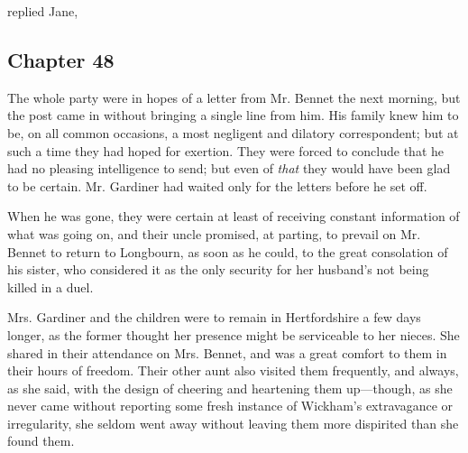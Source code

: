 replied Jane, 

\subsection[chapter-48]{\useURL[url48][][][]\from[url48] Chapter 48}

The whole party were in hopes of a letter from Mr. Bennet the next morning, but the post came in without bringing a single line from him. His family knew him to be, on all common occasions, a most negligent and dilatory correspondent; but at such a time they had hoped for exertion. They were forced to conclude that he had no pleasing intelligence to send; but even of {\em that} they would have been glad to be certain. Mr. Gardiner had waited only for the letters before he set off.

When he was gone, they were certain at least of receiving constant information of what was going on, and their uncle promised, at parting, to prevail on Mr. Bennet to return to Longbourn, as soon as he could, to the great consolation of his sister, who considered it as the only security for her husband's not being killed in a duel.

Mrs. Gardiner and the children were to remain in Hertfordshire a few days longer, as the former thought her presence might be serviceable to her nieces. She shared in their attendance on Mrs. Bennet, and was a great comfort to them in their hours of freedom. Their other aunt also visited them frequently, and always, as she said, with the design of cheering and heartening them up---though, as she never came without reporting some fresh instance of Wickham's extravagance or irregularity, she seldom went away without leaving them more dispirited than she found them.

